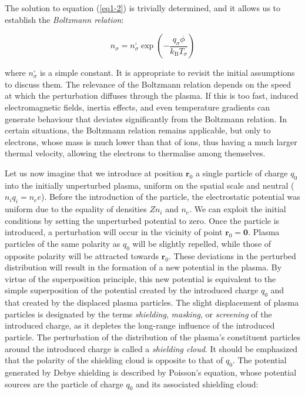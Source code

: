 The solution to equation (\ref{eq1-2}) is trivially determined, and it allows us to establish the \textit{Boltzmann relation}:

\begin{equation}
    \label{eq1-3}
    n_\sigma=n_\sigma^\square\exp\left(-\frac{q_\sigma\phi}{k_\mathrm{B}T_\sigma}\right)
\end{equation}

where $n_\sigma^\square$ is a simple constant. It is appropriate to revisit the initial assumptions to discuss them. The relevance of the Boltzmann relation depends on the speed at which the perturbation diffuses through the plasma. If this is too fast, induced electromagnetic fields, inertia effects, and even temperature gradients can generate behaviour that deviates significantly from the Boltzmann relation. In certain situations, the Boltzmann relation remains applicable, but only to electrons, whose mass is much lower than that of ions, thus having a much larger thermal velocity, allowing the electrons to thermalise among themselves.

Let us now imagine that we introduce at position $\mathbf{r}_0$ a single particle of charge $q_0$ into the initially unperturbed plasma, uniform on the spatial scale and neutral ($n_iq_i=n_ee$). Before the introduction of the particle, the electrostatic potential was uniform due to the equality of densities $Zn_i$ and $n_e$. We can exploit the initial conditions by setting the unperturbed potential to zero. Once the particle is introduced, a perturbation will occur in the vicinity of point $\mathbf{r}_0=\mathbf{0}$. Plasma particles of the same polarity as $q_0$ will be slightly repelled, while those of opposite polarity will be attracted towards $\mathbf{r}_0$. These deviations in the perturbed distribution will result in the formation of a new potential in the plasma. By virtue of the superposition principle, this new potential is equivalent to the simple superposition of the potential created by the introduced charge $q_0$ and that created by the displaced plasma particles. The slight displacement of plasma particles is designated by the terms \textit{shielding}, \textit{masking}, or \textit{screening} of the introduced charge, as it depletes the long-range influence of the introduced particle. The perturbation of the distribution of the plasma's constituent particles around the introduced charge is called a \textit{shielding cloud}. It should be emphasized that the polarity of the shielding cloud is opposite to that of $q_0$. The potential generated by Debye shielding is described by Poisson's equation, whose potential sources are the particle of charge $q_0$ and its associated shielding cloud:

